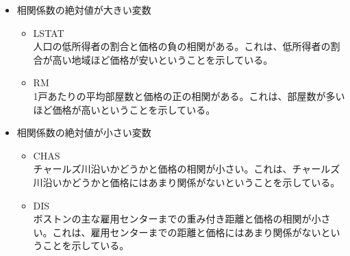 \documentclass{jsarticle}
\begin{document}
\begin{itemize}
  \item 相関係数の絶対値が大きい変数
    \begin{itemize}
      \item LSTAT \\
      人口の低所得者の割合と価格の負の相関がある。これは、低所得者の割合が高い地域ほど価格が安いということを示している。
      \item RM \\
      1戸あたりの平均部屋数と価格の正の相関がある。これは、部屋数が多いほど価格が高いということを示している。
    \end{itemize}
  \item 相関係数の絶対値が小さい変数
    \begin{itemize}
      \item CHAS \\
      チャールズ川沿いかどうかと価格の相関が小さい。これは、チャールズ川沿いかどうかと価格にはあまり関係がないということを示している。
      \item DIS \\
      ボストンの主な雇用センターまでの重み付き距離と価格の相関が小さい。これは、雇用センターまでの距離と価格にはあまり関係がないということを示している。
    \end{itemize}
\end{itemize}
\end{document}
